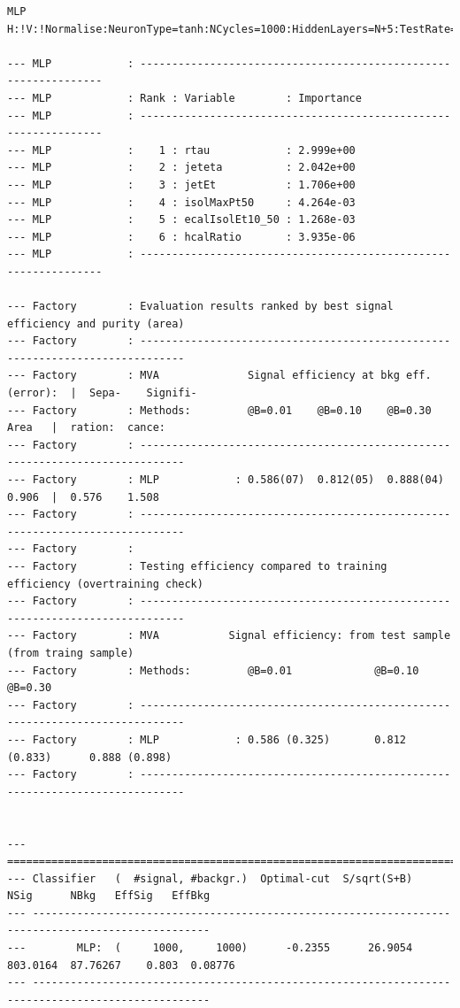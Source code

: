 \begin{verbatim}
MLP  H:!V:!Normalise:NeuronType=tanh:NCycles=1000:HiddenLayers=N+5:TestRate=5

--- MLP            : ----------------------------------------------------------------
--- MLP            : Rank : Variable        : Importance
--- MLP            : ----------------------------------------------------------------
--- MLP            :    1 : rtau            : 2.999e+00
--- MLP            :    2 : jeteta          : 2.042e+00
--- MLP            :    3 : jetEt           : 1.706e+00
--- MLP            :    4 : isolMaxPt50     : 4.264e-03
--- MLP            :    5 : ecalIsolEt10_50 : 1.268e-03
--- MLP            :    6 : hcalRatio       : 3.935e-06
--- MLP            : ----------------------------------------------------------------

--- Factory        : Evaluation results ranked by best signal efficiency and purity (area)
--- Factory        : -----------------------------------------------------------------------------
--- Factory        : MVA              Signal efficiency at bkg eff. (error):  |  Sepa-    Signifi-
--- Factory        : Methods:         @B=0.01    @B=0.10    @B=0.30    Area   |  ration:  cance:  
--- Factory        : -----------------------------------------------------------------------------
--- Factory        : MLP            : 0.586(07)  0.812(05)  0.888(04)  0.906  |  0.576    1.508
--- Factory        : -----------------------------------------------------------------------------
--- Factory        : 
--- Factory        : Testing efficiency compared to training efficiency (overtraining check)
--- Factory        : -----------------------------------------------------------------------------
--- Factory        : MVA           Signal efficiency: from test sample (from traing sample) 
--- Factory        : Methods:         @B=0.01             @B=0.10            @B=0.30   
--- Factory        : -----------------------------------------------------------------------------
--- Factory        : MLP            : 0.586 (0.325)       0.812 (0.833)      0.888 (0.898)
--- Factory        : -----------------------------------------------------------------------------


--- ==================================================================================================
--- Classifier   (  #signal, #backgr.)  Optimal-cut  S/sqrt(S+B)      NSig      NBkg   EffSig   EffBkg
--- --------------------------------------------------------------------------------------------------
---        MLP:  (     1000,     1000)      -0.2355      26.9054  803.0164  87.76267    0.803  0.08776
--- --------------------------------------------------------------------------------------------------

\end{verbatim}
\normalsize

